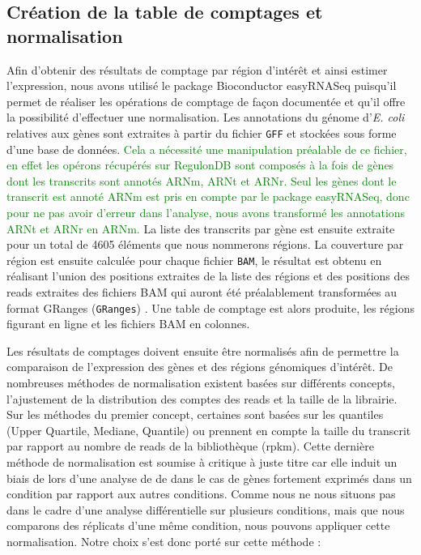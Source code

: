 \documentclass[12pt,a4paper]{report}
\begin{document}
\begin{onehalfspace}
\section*{Création de la table de comptages et normalisation}
Afin d'obtenir des résultats de comptage par région d'intérêt et ainsi estimer l'expression, nous avons utilisé le package Bioconductor easyRNASeq \citep{Delhomme2012} puisqu'il permet de réaliser les opérations de comptage de façon documentée et qu'il offre la possibilité d'effectuer une normalisation. Les annotations du génome d'\textit{E. coli} relatives aux gènes sont extraites à partir du fichier \texttt{GFF} et stockées sous forme d'une base de données. \textcolor{green}{Cela a nécessité une manipulation préalable de ce fichier, en effet les opérons récupérés sur RegulonDB sont composés à la fois de gènes dont les transcrits sont annotés ARNm, ARNt et ARNr. Seul les gènes dont le transcrit est annoté ARNm est pris en compte par le package easyRNASeq, donc pour ne pas avoir d'erreur dans l'analyse, nous avons transformé les annotations ARNt et ARNr en ARNm.}
La liste des transcrits par gène est ensuite extraite pour un total de 4605 éléments que nous nommerons régions. La couverture par région est ensuite calculée pour chaque fichier \texttt{BAM}, le résultat est obtenu en réalisant l'union des positions extraites de la liste des régions et des positions des reads extraites des fichiers BAM qui auront été préalablement transformées au format \gls{GRanges} (\texttt{GRanges})  \citep{Lawrence2013}. Une table de comptage est alors produite, les régions figurant en ligne et les fichiers BAM en colonnes.

Les résultats de comptages doivent ensuite être normalisés afin de permettre la comparaison de l'expression des gènes et des régions génomiques d'intérêt. De nombreuses méthodes de normalisation existent basées sur différents concepts, l'ajustement de la distribution des comptes des reads et la taille de la librairie. Sur les méthodes du premier concept, certaines sont basées sur les quantiles (Upper Quartile, Mediane, Quantile) ou prennent en compte la taille du transcrit par rapport au nombre de reads de la bibliothèque (\gls{rpkm}). Cette dernière méthode de normalisation est soumise à critique à juste titre \citep{Dillies2013} car elle induit un biais de lors d'une analyse de \gls{de} dans le cas de gènes fortement exprimés dans un condition par rapport aux autres conditions. Comme nous ne nous situons pas dans le cadre d'une analyse différentielle sur plusieurs conditions, mais que nous comparons des réplicats d'une même condition, nous pouvons appliquer cette normalisation. Notre choix s'est donc porté sur cette méthode \citep{Mortazavi2008} :


\end{onehalfspace}
\end{document}
